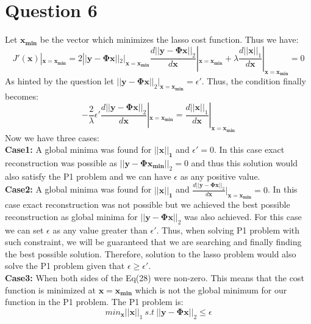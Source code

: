 \documentclass[12pt]{article}
\begin{document}
\section*{Question 6}
Let $\boldsymbol{x_{min}}$ be the vector which minimizes the lasso cost function. Thus we have:
\begin{equation*}
    J'(\boldsymbol{x})|_{\boldsymbol{x = x_{min}}} = 2||\boldsymbol{y-\Phi x}||_2|_{\boldsymbol{x = x_{min}}}\frac{d||\boldsymbol{y-\Phi x}||_2}{d\boldsymbol{x}}|_{\boldsymbol{x = x_{min}}}+\lambda\frac{d||\boldsymbol{x}||_1}{d\boldsymbol{x}}|_{\boldsymbol{x = x_{min}}}=0
\end{equation*}
As hinted by the question let $||\boldsymbol{y-\Phi x}||_2|_{\boldsymbol{x = x_{min}}} = \epsilon'$. Thus, the condition finally becomes:
\begin{equation}
    -\frac{2}{\lambda}\epsilon'\frac{d||\boldsymbol{y-\Phi x}||_2}{d\boldsymbol{x}}|_{\boldsymbol{x = x_{min}}} = \frac{d||\boldsymbol{x}||_1}{d\boldsymbol{x}}|_{\boldsymbol{x = x_{min}}}
\end{equation}
Now we have three cases:\\
\textbf{Case1:} A global minima was found for $\boldsymbol{||x||_1}$ and $\epsilon' = 0$. In this case exact reconstruction was possible as $||\boldsymbol{y-\Phi x_{min}}||_2 = 0$ and thus this solution would also satisfy the P1 problem and we can have $\epsilon$ as any positive value. \\
\textbf{Case2:} A global minima was found for $\boldsymbol{||x||_1}$ and $\frac{d||\boldsymbol{y-\Phi x}||_2}{d\boldsymbol{x}}|_{\boldsymbol{x = x_{min}}} = 0$. In this case exact reconstruction was not possible but we achieved the best possible reconstruction as global minima for $||\boldsymbol{y-\Phi x}||_2$ was also achieved. For this case we can set $\epsilon$ as any value greater than $\epsilon'$. Thus, when solving P1 problem with such constraint, we will be guaranteed that we are searching and finally finding the best possible solution. Therefore, solution to the lasso problem would also solve the P1 problem given that $\epsilon \geq \epsilon'$. \\
\textbf{Case3:} When both sides of the Eq(28) were non-zero. This means that the cost function is minimized at $\boldsymbol{x = x_{min}}$ which is not the global minimum for our function in the P1 problem. The P1 problem is:
\begin{equation*}
    min_{\boldsymbol{x}}||\boldsymbol{x}||_1 \ s.t\ ||\boldsymbol{y-\Phi x}||_2 \leq \epsilon
\end{equation*}
\end{document}
